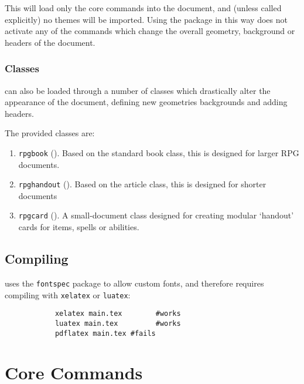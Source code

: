 			This will load only the core commands into the document, and (unless called explicitly) no themes will be imported. Using the package in this way does not activate any of the commands which change the overall geometry, background or headers of the document.

		\subsection{Classes}

			\rpgtex{} can also be loaded through a number of classes which drastically alter the appearance of the document, defining new geometries backgrounds and adding headers.

			The provided classes are:
			\begin{enumerate}
				\item \texttt{rpgbook} (). Based on the standard book class, this is designed for larger RPG documents.
				\item \texttt{rpghandout} (). Based on the article class, this is designed for shorter documents
				\item \texttt{rpgcard} (). A small-document class designed for creating modular `handout' cards for items, spells or abilities.
			\end{enumerate}
	\section{Compiling}

		\rpgtex{} uses the \texttt{fontspec} package to allow custom fonts, and therefore requires compiling with \texttt{xelatex} or \texttt{luatex}:

		\begin{lstlisting}
			xelatex main.tex		#works
			luatex main.tex			#works
			pdflatex main.tex #fails
		\end{lstlisting}

\onecolumn




\chapter{Core Commands}

	\blindtext{}



